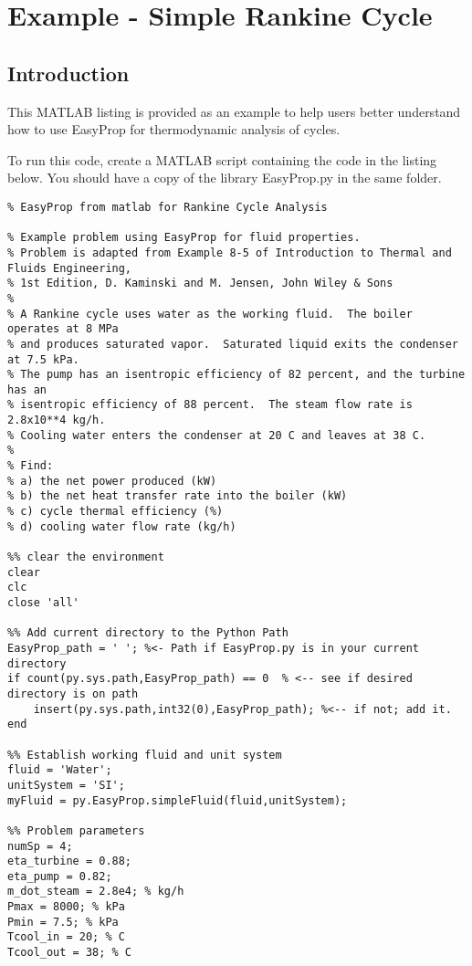 \chapter{Example - Simple Rankine Cycle}
\label{ch:ep_interface}

\section{Introduction}

This MATLAB listing is provided as an example to help users better understand how to use EasyProp for thermodynamic analysis of cycles.

To run this code, create a MATLAB script containing the code in the listing below.  You should have a copy of the library EasyProp.py in the same folder.


\begin{fullwidth}
\begin{lstlisting}
% EasyProp from matlab for Rankine Cycle Analysis

% Example problem using EasyProp for fluid properties.
% Problem is adapted from Example 8-5 of Introduction to Thermal and Fluids Engineering,
% 1st Edition, D. Kaminski and M. Jensen, John Wiley & Sons
% 
% A Rankine cycle uses water as the working fluid.  The boiler operates at 8 MPa
% and produces saturated vapor.  Saturated liquid exits the condenser at 7.5 kPa.
% The pump has an isentropic efficiency of 82 percent, and the turbine has an 
% isentropic efficiency of 88 percent.  The steam flow rate is 2.8x10**4 kg/h.
% Cooling water enters the condenser at 20 C and leaves at 38 C.
% 
% Find:
% a) the net power produced (kW)
% b) the net heat transfer rate into the boiler (kW)
% c) cycle thermal efficiency (%)
% d) cooling water flow rate (kg/h)

%% clear the environment
clear
clc
close 'all'

%% Add current directory to the Python Path
EasyProp_path = ' '; %<- Path if EasyProp.py is in your current directory
if count(py.sys.path,EasyProp_path) == 0  % <-- see if desired directory is on path
    insert(py.sys.path,int32(0),EasyProp_path); %<-- if not; add it.
end

%% Establish working fluid and unit system
fluid = 'Water';
unitSystem = 'SI';
myFluid = py.EasyProp.simpleFluid(fluid,unitSystem);

%% Problem parameters
numSp = 4;
eta_turbine = 0.88;
eta_pump = 0.82;
m_dot_steam = 2.8e4; % kg/h
Pmax = 8000; % kPa
Pmin = 7.5; % kPa
Tcool_in = 20; % C
Tcool_out = 38; % C


\end{lstlisting}
\end{fullwidth}
